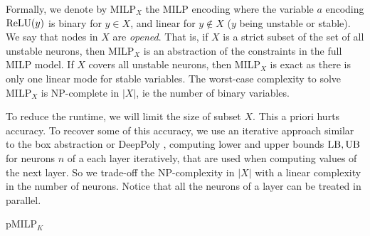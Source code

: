 Formally, we denote by MILP$_X$ the MILP encoding where the variable $a$ encoding $\mathrm{ReLU}(y)$ is binary for $y\in X$, and linear for $y\notin X$ ($y$ being unstable or stable). 
We say that nodes in $X$ are {\em opened}. 
That is, if $X$ is a strict subset of the set of all unstable neurons, then 
MILP$_X$ is an abstraction of the constraints in the full MILP model. If $X$ covers all unstable neurons, then MILP$_X$ is exact as there is only one linear mode for stable variables. The worst-case complexity to solve MILP$_X$ is NP-complete in $|X|$, ie the number of binary variables.

\smallskip

To reduce the runtime, we will limit the size of subset $X$. This a priori hurts accuracy. To recover some of this accuracy, we use an iterative approach similar to the box abstraction or DeepPoly \cite{deeppoly}, computing lower and upper bounds $\mathrm{LB},\mathrm{UB}$ for neurons $n$ of a each layer iteratively, that are used when computing values of the next layer.
So we trade-off the NP-complexity in $|X|$ with a linear complexity in the number of neurons. Notice that all the neurons of a layer can be treated in parallel.


\medskip




\begin{algorithm}[t!]
	\caption{pMILP$_K$}
	\label{algo1}
	
	
\end{algorithm}	


